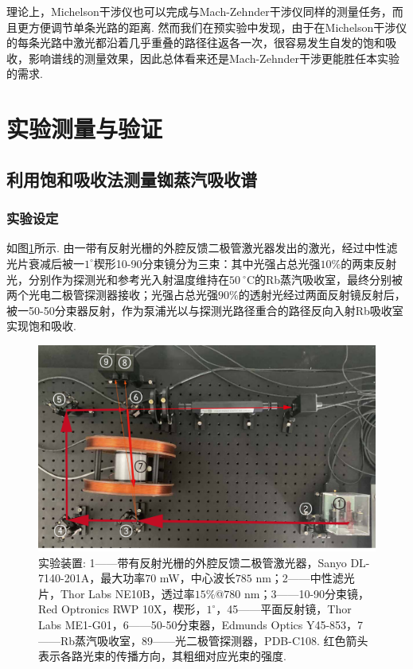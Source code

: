 \documentclass[a4paper, 10pt]{article}
\begin{document}
\begin{multicols*}{2}
理论上，Michelson干涉仪也可以完成与Mach-Zehnder干涉仪同样的测量任务，而且更方便调节单条光路的距离. 然而我们在预实验中发现，由于在Michelson干涉仪的每条光路中激光都沿着几乎重叠的路径往返各一次，很容易发生自发的饱和吸收，影响谱线的测量效果，因此总体看来还是Mach-Zehnder干涉更能胜任本实验的需求.

\section{实验测量与验证}

\subsection{利用饱和吸收法测量铷蒸汽吸收谱}

\subsubsection{实验设定}
如图\ref{light-path}所示. 由一带有反射光栅的外腔反馈二极管激光器发出的激光，经过中性滤光片衰减后被一$1^{\circ}$楔形10-90分束镜分为三束：其中光强占总光强$10\%$的两束反射光，分别作为探测光和参考光入射温度维持在$50~^{\circ}$C的Rb蒸汽吸收室，最终分别被两个光电二极管探测器接收；光强占总光强$90\%$的透射光经过两面反射镜反射后，被一50-50分束器反射，作为泵浦光以与探测光路径重合的路径反向入射Rb吸收室实现饱和吸收.

\begin{figure}[H]
    \centering
    \includegraphics[width=.9\columnwidth]{LightPath.pdf}
    \caption{实验装置: \textcircled{\footnotesize{1}}——带有反射光栅的外腔反馈二极管激光器，Sanyo DL-7140-201A，最大功率$70$ mW，中心波长$785$ nm；\textcircled{\footnotesize{2}}——中性滤光片，Thor Labs NE10B，透过率$15\%$@$780$ nm；\textcircled{\footnotesize{3}}——10-90分束镜，Red Optronics RWP 10X，楔形，$1^{\circ}$，\textcircled{\footnotesize{4}}\textcircled{\footnotesize{5}}——平面反射镜，Thor Labs ME1-G01，\textcircled{\footnotesize{6}}——50-50分束器，Edmunds Optics Y45-853，\textcircled{\footnotesize{7}}——Rb蒸汽吸收室，\textcircled{\footnotesize{8}}\textcircled{\footnotesize{9}}——光二极管探测器，PDB-C108. 红色箭头表示各路光束的传播方向，其粗细对应光束的强度.}
    \label{light-path}
\end{figure}


\end{multicols*}
\end{document}
